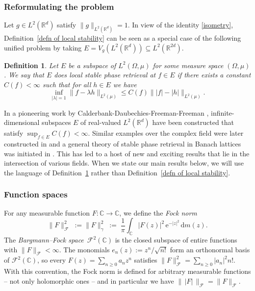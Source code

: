 \documentclass[11pt]{amsart}
\newtheorem{definition}[theorem]{Definition}
\theoremstyle{remark}
\begin{document}
\subsubsection{Reformulating the problem}
Let $g\in L^2(\mathbb{R}^d)$ satisfy $\|g\|_{ L^2(\mathbb{R}^d)}=1$. In view of the identity \eqref{isometry}, Definition~\ref{defn of local stability} can be seen as a special case of the following unified problem by taking $E=V_g(L^2(\mathbb{R}^{d}))\subseteq L^2(\mathbb{R}^{2d})$.

\begin{definition}\label{defn of local stability2}
    Let $E$ be a subspace of $L^2(\Omega,\mu)$ for some measure space $(\Omega,\mu)$. We say that $E$ does \emph{local stable phase retrieval at $f\in E$} if there exists a constant $C(f)<\infty$ such that for all $h\in E$ we have
    \begin{equation*}
        \inf_{|\lambda|=1}\|f-\lambda h\|_{L^2(\mu)}\leq C(f) \| |f|-|h|\|_{L^2(\mu)}.
    \end{equation*}
\end{definition}
In a pioneering work by Calderbank-Daubechies-Freeman-Freeman \cite{calderbank2022stable}, infinite-dimensional subspaces $E$ of real-valued $L^2(\mathbb{R}^d)$ have been constructed that satisfy $\sup_{f\in E}C(f)<\infty$. Similar examples over the complex field were later constructed in \cite{MR4837558} and a general theory of stable phase retrieval in Banach lattices was initiated in \cite{MR4800909}. This has led to a host of new and exciting results \cite{camunez2025characterization,garcia2025isometric,garcia2025existence} that lie in the intersection of various fields. When we state our main results below, we will use the language of Definition~\ref{defn of local stability2} rather than Definition~\ref{defn of local stability}.

\subsubsection{Function spaces} \label{Sec:Fun}

For any measurable function $F \colon \mathbb{C} \to \mathbb{C}$, we define the
\emph{Fock norm}
\[
\lVert F \rVert_{\mathcal{F}}^2
\;:=\lVert F \rVert_{\gamma}^2
\;:=\;
\frac{1}{\pi}\int_{\mathbb{C}} \lvert F(z) \rvert^2 \, \mathrm{e}^{-\lvert z \rvert^2}\,\mathrm{d} m(z).
\]
The \emph{Bargmann--Fock space}~$\mathcal{F}^2(\mathbb{C})$ is the closed subspace of entire functions with
$\lVert F \rVert_{\mathcal{F}} < \infty$.
The monomials $e_n(z) := z^n/\sqrt{n!}$ form an orthonormal basis of $\mathcal{F}^2(\mathbb{C})$, so every
$F(z) = \sum_{n \ge 0} a_n z^n$ satisfies
$\lVert F \rVert_{\mathcal{F}}^2 = \sum_{n \ge 0} \lvert a_n \rvert^2 n!$.
With this convention, the Fock norm is defined for arbitrary measurable
functions --  not only holomorphic ones -- and in particular we have
$\lVert \,\lvert F \rvert\, \rVert_{\mathcal{F}} = \lVert F \rVert_{\mathcal{F}}$.
 \vspace{0.5em}
\end{document}
